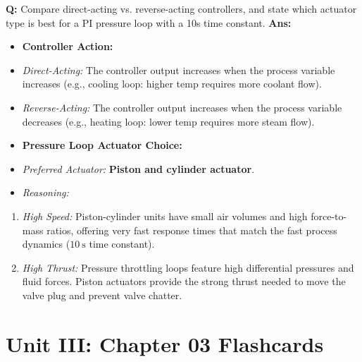 \documentclass[10pt,a4paper,twocolumn]{article}
\begin{document}
\begin{tcolorbox}[
  colback=white,
  colframe=UnitColorTwo,
  colbacktitle=gray!10!white,
  coltitle=black,
  fonttitle=\bfseries\sffamily\small,
  title={Unit II $\bullet$ Card 16: Controller Action \& Actuator Selection (Q2.6)},
  boxrule=1.2pt,
  arc=2mm,
  outer arc=2mm,
  boxsep=1.5mm,
  top=1mm,
  bottom=1mm,
  left=1.5mm,
  right=1.5mm,
  before skip=2.5mm,
  after skip=2.5mm
]
\textbf{Q:} Compare direct-acting vs. reverse-acting controllers, and state which actuator type is best for a PI pressure loop with a 10s time constant.
\tcbline
\textbf{Ans:} \begin{itemize}
  \item   \textbf{Controller Action:}
  \item   \textit{Direct-Acting:} The controller output increases when the process variable increases (e.g., cooling loop: higher temp requires more coolant flow).
  \item   \textit{Reverse-Acting:} The controller output increases when the process variable decreases (e.g., heating loop: lower temp requires more steam flow).
  \item   \textbf{Pressure Loop Actuator Choice:}
  \item   \textit{Preferred Actuator:} \textbf{Piston and cylinder actuator}.
  \item   \textit{Reasoning:}
\end{itemize}
\begin{enumerate}
  \item \textit{High Speed:} Piston-cylinder units have small air volumes and high force-to-mass ratios, offering very fast response times that match the fast process dynamics ($10\ \text{s}$ time constant).
  \item \textit{High Thrust:} Pressure throttling loops feature high differential pressures and fluid forces. Piston actuators provide the strong thrust needed to move the valve plug and prevent valve chatter.
\end{enumerate}
\end{tcolorbox}

\section*{Unit III: Chapter 03 Flashcards}
\end{document}
